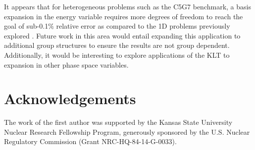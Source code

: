 \documentclass{anstrans}
\begin{document}
It appears that for heterogeneous problems such as the C5G7 benchmark, a basis
expansion in the energy variable requires more degrees of freedom to reach the
goal of sub-0.1\% relative error as compared to the 1D problems previously
explored \cite{annualANS, reedThesis}.  Future work in this area would entail
expanding this application to additional group structures to ensure the results
are not group dependent.  Additionally, it would be interesting to explore
applications of the KLT to expansion in other phase space variables.

\section{Acknowledgements}
The work of the first author was supported by the Kansas State University
Nuclear Research Fellowship Program, generously sponsored by the U.S. Nuclear
Regulatory Commission (Grant NRC-HQ-84-14-G-0033).




\end{document}
